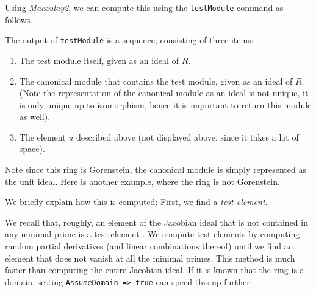 \documentclass{amsart}
\begin{document}
Using \emph{Macaulay2}, we can compute this using the \texttt{testModule} command as follows.

\medskip
{\small{}
}\medskip

The output of \texttt{testModule} is a sequence, consisting of three items:
\begin{enumerate}[(1)]
\item The test module itself, given as an ideal of $R$.
\item The canonical module that contains the test module, given as an ideal of $R$.  (Note the representation of the canonical module as an ideal is not unique, it is only unique up to isomorphism, hence it is important to return this module as well).
\item The element $u$ described above (not displayed above, since it takes a lot of space).
\end{enumerate}

Note since this ring is Gorenstein, the canonical module is simply represented as the unit ideal. Here is another example, where the ring is not Gorenstein.

\medskip
{\small{}
}\medskip

We briefly explain how this is computed:  First, we find a \emph{test element}.
\begin{remark}
\label{rem.ComputationOfTestElements}
We recall that, roughly, an element of the Jacobian ideal that is not contained in any minimal prime is a test element \cite{HochsterFoundations}.  We compute test elements by computing random partial derivatives (and linear combinations thereof) until we find an element that does not vanish at all the minimal primes.  This method is much faster than computing the entire Jacobian ideal.  If it is known that the ring is a domain, setting \texttt{AssumeDomain => true} can speed this up further.
\end{remark}
\end{document}
